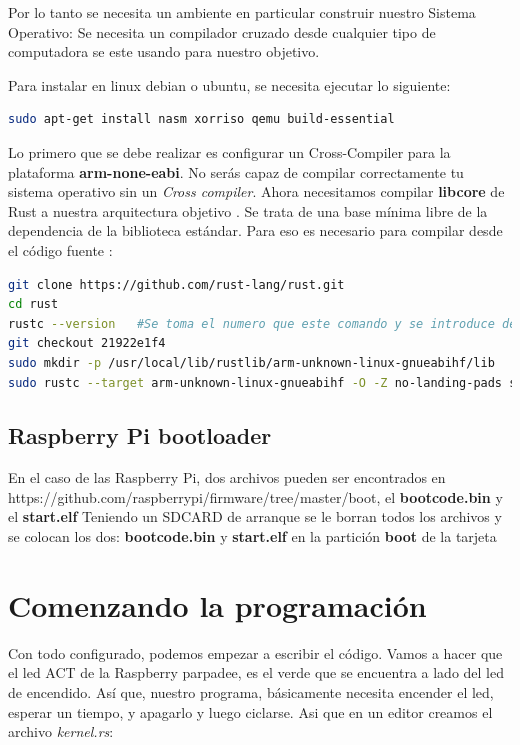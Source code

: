 \documentclass[12pt, twoside]{report}
\begin{document}
Por lo tanto se necesita un ambiente en particular construir nuestro Sistema Operativo: Se necesita un compilador cruzado desde cualquier tipo de computadora se este usando para nuestro objetivo.

Para instalar en linux debian o ubuntu, se necesita ejecutar lo siguiente:

\begin{lstlisting}[language=bash]
sudo apt-get install nasm xorriso qemu build-essential
\end{lstlisting}

Lo primero que se debe realizar es configurar un Cross-Compiler para la plataforma \textbf{arm-none-eabi}. No serás capaz de compilar correctamente tu sistema operativo sin un \textit{Cross compiler}. Ahora necesitamos compilar \textbf{libcore} de Rust a nuestra arquitectura objetivo . Se trata de una base mínima libre de la dependencia de la biblioteca estándar. Para eso es necesario para compilar desde el código fuente :

\begin{lstlisting}[language=bash]
git clone https://github.com/rust-lang/rust.git
cd rust
rustc --version   #Se toma el numero que este comando y se introduce despues del comando checkout de la linea siguiente
git checkout 21922e1f4
sudo mkdir -p /usr/local/lib/rustlib/arm-unknown-linux-gnueabihf/lib 
sudo rustc --target arm-unknown-linux-gnueabihf -O -Z no-landing-pads src/libcore/lib.rs --out-dir /usr/local/lib/rustlib/arm-unknown-linux-gnueabihf/lib
\end{lstlisting}

\subsection{Raspberry Pi bootloader}

En el caso de las Raspberry Pi, dos archivos pueden ser encontrados en https://github.com/raspberrypi/firmware/tree/master/boot, el \textbf{bootcode.bin} y el \textbf{start.elf}
Teniendo un SDCARD de arranque se le borran todos los archivos y se colocan los dos:  \textbf{bootcode.bin} y \textbf{start.elf} en la partición \textbf{boot} de la tarjeta

\section{Comenzando la programación}

Con todo configurado, podemos empezar a escribir el código. Vamos a hacer que el led ACT de la Raspberry parpadee, es el verde que se encuentra a lado del led de encendido. Así que, nuestro programa, básicamente necesita encender el led, esperar un tiempo, y apagarlo y luego ciclarse. Asi que en un editor creamos el archivo \emph{kernel.rs}:
\end{document}
